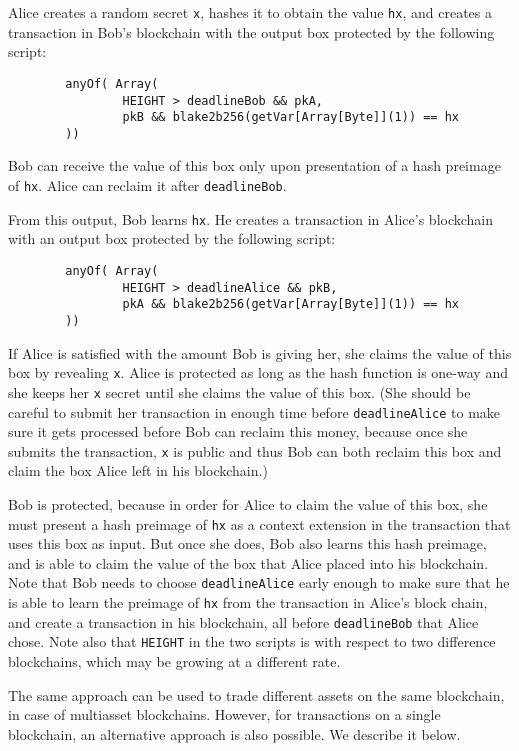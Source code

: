 \documentclass[11pt]{article}
\newcommand{\authnote}[2]{\marginpar{\parbox{\marginparwidth}{\tiny %
  \textsf{#1 {\textcolor{blue}{notes: #2}}}}}%
  \textcolor{blue}{\textbf{\dag}}}
\newcommand{\authnote}[2]{
  \textsf{#1 \textcolor{blue}{: #2}}}
\newcommand{\authnote}[2]{}
\newcommand{\dnote}[1]{{\authnote{\textcolor{brown}{Dima notes}}{#1}}}
\begin{document}
Alice creates a random secret \texttt{x}, hashes it to obtain the value \texttt{hx}, and creates a transaction in Bob's blockchain with the output box protected by the following script:
\begin{verbatim}
        anyOf( Array(
                HEIGHT > deadlineBob && pkA,
                pkB && blake2b256(getVar[Array[Byte]](1)) == hx
        ))
\end{verbatim}
Bob can receive the value of this box only upon presentation of a hash preimage of \texttt{hx}. Alice can reclaim it after \texttt{deadlineBob}.

From this output, Bob learns \texttt{hx}. He creates a transaction in Alice's blockchain with an output box protected by the following script:
\begin{verbatim}
        anyOf( Array(
                HEIGHT > deadlineAlice && pkB,
                pkA && blake2b256(getVar[Array[Byte]](1)) == hx
        ))
\end{verbatim}

If Alice is satisfied with the amount Bob is giving her, she claims the value of this box by revealing \texttt{x}. Alice is protected as long as the hash function is one-way and she keeps her \texttt{x} secret until she claims the value of this box. (She should be careful to submit her transaction in enough time before \texttt{deadlineAlice} to make sure it gets processed before Bob can reclaim this money, because once she submits the transaction, \texttt{x} is public and thus Bob can both reclaim this box and claim the box Alice left in his blockchain.)

Bob is protected, because in order for Alice to claim the value of this box, she must present a hash preimage of \texttt{hx} as a context extension in the transaction that uses this box as input. But once she does, Bob also learns this hash preimage, and is able to claim the value of the box that Alice placed into his blockchain. Note that Bob needs to choose \texttt{deadlineAlice} early enough to make sure that he is able to learn the preimage of \texttt{hx} from the transaction in Alice's block chain, and create a transaction in his blockchain, all before \texttt{deadlineBob} that Alice chose. Note also that \texttt{HEIGHT} in the two scripts is with respect to two difference blockchains, which may be growing at a different rate.

The same approach can be used to trade different assets on the same blockchain, in case of multiasset blockchains. However, for transactions on a single blockchain, an alternative approach is also possible. We describe it below.
\dnote{Correct script should also have check of preimage length, otherwise the following attack is possible: imagine blockchain A allows transactions of size up to 1Kb, blockchain B allows transactions of size up to 10 Kb. Alice chose secret x of size 2Kb, and when she releases it in blockchain B (with tx size limit 10Kb) Bob knows the secret, but he can not use it, because blockchain A size limit is 1 Kb. We may add this length check or mention that this is principal (insecure) way of doing atomic swap}
\end{document}
